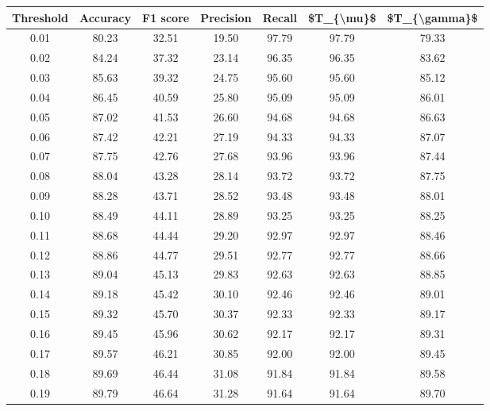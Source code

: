 \begin{tabular}{|c|c|c|c|c|c|c|}
\hline
 Threshold &  Accuracy &  F1 score &  Precision &  Recall &  \$T\_\{\textbackslash mu\}\$ &  \$T\_\{\textbackslash gamma\}\$ \\
\hline
      0.01 &     80.23 &     32.51 &      19.50 &   97.79 &      97.79 &         79.33 \\
      0.02 &     84.24 &     37.32 &      23.14 &   96.35 &      96.35 &         83.62 \\
      0.03 &     85.63 &     39.32 &      24.75 &   95.60 &      95.60 &         85.12 \\
      0.04 &     86.45 &     40.59 &      25.80 &   95.09 &      95.09 &         86.01 \\
      0.05 &     87.02 &     41.53 &      26.60 &   94.68 &      94.68 &         86.63 \\
      0.06 &     87.42 &     42.21 &      27.19 &   94.33 &      94.33 &         87.07 \\
      0.07 &     87.75 &     42.76 &      27.68 &   93.96 &      93.96 &         87.44 \\
      0.08 &     88.04 &     43.28 &      28.14 &   93.72 &      93.72 &         87.75 \\
      0.09 &     88.28 &     43.71 &      28.52 &   93.48 &      93.48 &         88.01 \\
      0.10 &     88.49 &     44.11 &      28.89 &   93.25 &      93.25 &         88.25 \\
      0.11 &     88.68 &     44.44 &      29.20 &   92.97 &      92.97 &         88.46 \\
      0.12 &     88.86 &     44.77 &      29.51 &   92.77 &      92.77 &         88.66 \\
      0.13 &     89.04 &     45.13 &      29.83 &   92.63 &      92.63 &         88.85 \\
      0.14 &     89.18 &     45.42 &      30.10 &   92.46 &      92.46 &         89.01 \\
      0.15 &     89.32 &     45.70 &      30.37 &   92.33 &      92.33 &         89.17 \\
      0.16 &     89.45 &     45.96 &      30.62 &   92.17 &      92.17 &         89.31 \\
      0.17 &     89.57 &     46.21 &      30.85 &   92.00 &      92.00 &         89.45 \\
      0.18 &     89.69 &     46.44 &      31.08 &   91.84 &      91.84 &         89.58 \\
      0.19 &     89.79 &     46.64 &      31.28 &   91.64 &      91.64 &         89.70 \\

\end{tabular}

